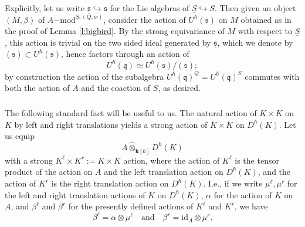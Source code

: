 \documentclass{amsart}
\theoremstyle{definition}
\newcommand{\lmod}{\on{-mod}}
\newcommand{\sss}{\subsubsection{}}
\newcommand{\on}{\mathrm}
\newcommand{\bk}{\mathbf{k}}
\numberwithin{equation}{section}
\begin{document}
{ Explicitly, let us write $\underline{\mathfrak{s}} \hookrightarrow \mathfrak{s}$ for the Lie algebras of $\underline{S} \hookrightarrow S$. Then given an object $(M, \beta)$ of $A\lmod^{\underline{S}, (Q,w)}$, consider the action of $U^\hbar(\mathfrak{s})$ on $M$ obtained as in the proof of Lemma \ref{l:bigbird}. By the strong equivariance of $M$ with respect to $\underline{S}$, this action is trivial on the two sided ideal generated by $\underline{\mathfrak{s}}$, which we denote by $(\underline{\mathfrak{s}}) \subset U^\hbar(\mathfrak{s})$, hence factors through an action of $$U^\hbar(\mathfrak{q}) \simeq U^\hbar(\mathfrak{s}) / (\underline{\mathfrak{s}});$$by construction the action of the subalgebra $U^\hbar(\mathfrak{q})^Q = U^\hbar(\mathfrak{q})^S$ commutes with both the action of $A$ and the coaction of $S$, as desired. 
}


\iffalse 
\sss \label{s:strongaction}Given a map $(A, \alpha, \phi) \rightarrow (A', \alpha', \phi')$ of graded complete algebras with strong actions, note that we have associated induction and restriction functors
$$\on{ind}:=A'\otimes_A-: A\lmod^{\underline{S}, (Q,w)} \rightleftarrows A'\lmod^{\underline{S}, (Q,w)}: \on{res},$$
compatible with the forgetting to the nonequivariant adjunction 
$$\on{ind}: A\lmod \rightleftarrows A'\lmod: \on{res}.$$
As a standard generalization of the functor $\on{ind}$, given an $A \underset{\bk[\hbar]} \otimes (A^{'})^{op}$-module $B$ strongly equivariant for the diagonal action of $S$, tensoring with $B$ yields an associated functor 
\begin{equation} \label{e:tensbimod} B \underset{A'} \otimes -: A'\lmod^{\underline{S}, (Q,w)} \rightarrow A\lmod^{\underline{S},(Q, w)};\end{equation}
note that specializing to the case of $B = A'$ yields $\on{ind}$. 
\fi 

\sss The following standard fact will be useful to us. The natural action of $K \times K$ on $K$ by left and right translations yields a strong action of $K \times K$ on $D^\hbar(K)$. Let us equip $$A \widehat{\otimes}_{\bk[\hbar]} D^\hbar(K)$$with a strong $K^\ell \times K^r := K \times K$ action, where the action of $K^\ell$ is the tensor product of the action on $A$ and the left translation action on $D^\hbar(K)$, and the action of $K^r$ is the right translation action on $D^\hbar(K)$. { I.e., if we write $\mu^\ell, \mu^r$ for the left and right translation actions of $K$ on $D^\hbar(K)$,  $\alpha$ for the action of $K$ on $A$, and $\beta^\ell$ and $\beta^r$ for the presently defined actions of $K^\ell$ and $K^r$, we have 
$$\beta^\ell = \alpha \otimes \mu^\ell \quad \text{and} \quad \beta^r = \on{id}_A \otimes \mu^r.$$
}
\end{document}
